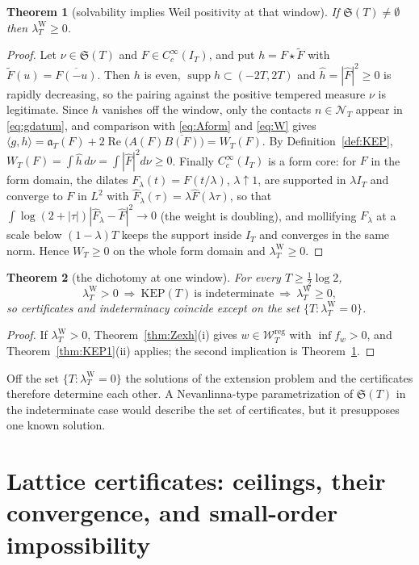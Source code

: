 \documentclass[11pt]{amsart}
\newtheorem{theorem}{Theorem}[section]
\theoremstyle{definition}
\theoremstyle{remark}
\newcommand{\Rel}{\operatorname{Re}}
\newcommand{\supp}{\operatorname{supp}}
\newcommand{\IT}{I_T}
\newcommand{\lamW}{\lambda^{\mathrm W}_T}
\newcommand{\Fh}{\widehat F}
\newcommand{\Wcl}{\mathcal W_T}
\newcommand{\NT}{\mathcal N_T}
\begin{document}
\begin{theorem}[solvability implies Weil positivity at that window]\label{thm:KEP2}
If $\mathfrak S(T)\ne\emptyset$ then $\lamW\ge0$.
\end{theorem}
\begin{proof}
Let $\nu\in\mathfrak S(T)$ and $F\in C_c^\infty(\IT)$, and put $h=F\star\widetilde F$ with
$\widetilde F(u)=\overline{F(-u)}$. Then $h$ is even, $\supp h\subset(-2T,2T)$ and
$\widehat h=|\Fh|^2\ge0$ is rapidly decreasing, so the pairing against the positive tempered measure
$\nu$ is legitimate. Since $h$ vanishes off the window, only the contacts $n\in\NT$ appear in
\eqref{eq:gdatum}, and comparison with \eqref{eq:Aform} and \eqref{eq:W} gives
$\langle g,h\rangle=\mathfrak a_T(F)+2\Rel\big(A(F)\overline{B(F)}\big)=W_T(F)$. By
Definition~\ref{def:KEP}, $W_T(F)=\int\widehat h\,d\nu=\int|\Fh|^2d\nu\ge0$. Finally
$C_c^\infty(\IT)$ is a form core: for $F$ in the form domain, the dilates $F_\lambda(t)=F(t/\lambda)$,
$\lambda\uparrow1$, are supported in $\lambda\IT$ and converge to $F$ in $L^2$ with
$\Fh_\lambda(\tau)=\lambda\Fh(\lambda\tau)$, so that
$\int\log(2+|\tau|)|\Fh_\lambda-\Fh|^2\to0$ (the weight is doubling), and mollifying $F_\lambda$ at a
scale below $(1-\lambda)T$ keeps the support inside $\IT$ and converges in the same norm. Hence
$W_T\ge0$ on the whole form domain and $\lamW\ge0$.
\end{proof}

\begin{theorem}[the dichotomy at one window]\label{thm:KEPdich}
For every $T\ge\frac12\log2$,
\[
\lamW>0\ \Longrightarrow\ \mathrm{KEP}(T)\ \text{is indeterminate}\ \Longrightarrow\ \lamW\ge0 ,
\]
so certificates and indeterminacy coincide except on the set $\{T:\lamW=0\}$.
\end{theorem}
\begin{proof}
If $\lamW>0$, Theorem~\ref{thm:Zexh}(i) gives $w\in\Wcl^{\mathrm{reg}}$ with $\inf f_w>0$, and
Theorem~\ref{thm:KEP1}(ii) applies; the second implication is Theorem~\ref{thm:KEP2}.
\end{proof}

Off the set $\{T:\lamW=0\}$ the solutions of the extension problem and the certificates therefore
determine each other. A Nevanlinna-type parametrization of $\mathfrak S(T)$ in the indeterminate case
would describe the set of certificates, but it presupposes one known solution.


\section{Lattice certificates: ceilings, their convergence, and small-order impossibility}\label{sec:class}
\end{document}

